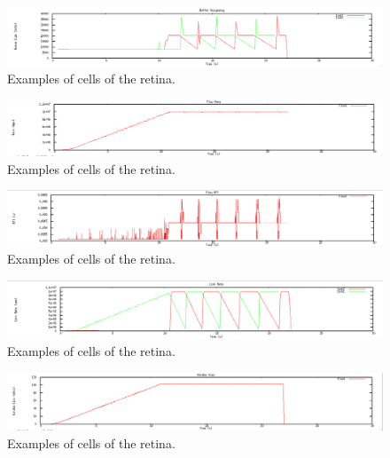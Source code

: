 \documentclass[12pt]{article}
\begin{document}

\begin{figure}[t]
\centering \includegraphics[scale=.35]{figures/Test1_Vegas/buffer_occ.png}
\caption{Examples of cells of the retina.}
\label{fig:test1_vegas_buffer_occ}
\end{figure}

\begin{figure}[t]
\centering \includegraphics[scale=.35]{figures/Test1_Vegas/flow_rate.png}
\caption{Examples of cells of the retina.}
\label{fig:test1_vegas_flow_rate}
\end{figure}

\begin{figure}[t]
\centering \includegraphics[scale=.35]{figures/Test1_Vegas/flow_rtt.png}
\caption{Examples of cells of the retina.}
\label{fig:test1_vegas_flow_rtt}
\end{figure}

\begin{figure}[t]
\centering \includegraphics[scale=.35]{figures/Test1_Vegas/link_rate.png}
\caption{Examples of cells of the retina.}
\label{fig:test1_vegas_link_rate}
\end{figure}

\begin{figure}[t]
\centering \includegraphics[scale=.35]{figures/Test1_Vegas/window_size.png}
\caption{Examples of cells of the retina.}
\label{fig:test1_vegas_window_size}
\end{figure}
\end{document}
